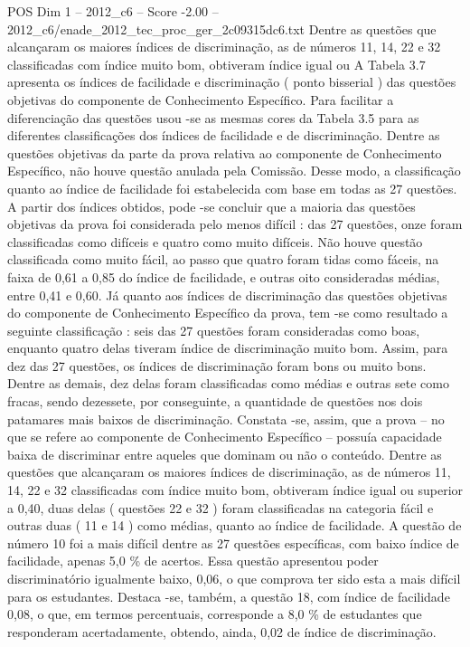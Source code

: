 \begin{textsample}{POS Dim 1 – 2012\_c6 – Score -2.00 – 2012\_c6/enade\_2012\_tec\_proc\_ger\_2c09315dc6.txt}
Dentre as questões que alcançaram os maiores índices de discriminação, as de números 11, 14, 22 e 32 classificadas com índice muito bom, obtiveram índice igual ou A Tabela 3.7 apresenta os índices de facilidade e discriminação ( ponto bisserial ) das questões objetivas do componente de Conhecimento Específico.
Para facilitar a diferenciação das questões usou -se as mesmas cores da Tabela 3.5 para as diferentes classificações dos índices de facilidade e de discriminação.
Dentre as questões objetivas da parte da prova relativa ao componente de Conhecimento Específico, não houve questão anulada pela Comissão.
Desse modo, a classificação quanto ao índice de facilidade foi estabelecida com base em todas as 27 questões.
A partir dos índices obtidos, pode -se concluir que a maioria das questões objetivas da prova foi considerada pelo menos difícil : das 27 questões, onze foram classificadas como difíceis e quatro como muito difíceis.
Não houve questão classificada como muito fácil, ao passo que quatro foram tidas como fáceis, na faixa de 0,61 a 0,85 do índice de facilidade, e outras oito consideradas médias, entre 0,41 e 0,60.
Já quanto aos índices de discriminação das questões objetivas do componente de Conhecimento Específico da prova, tem -se como resultado a seguinte classificação : seis das 27 questões foram consideradas como boas, enquanto quatro delas tiveram índice de discriminação muito bom.
Assim, para dez das 27 questões, os índices de discriminação foram bons ou muito bons.
Dentre as demais, dez delas foram classificadas como médias e outras sete como fracas, sendo dezessete, por conseguinte, a quantidade de questões nos dois patamares mais baixos de discriminação.
Constata -se, assim, que a prova – no que se refere ao componente de Conhecimento Específico – possuía capacidade baixa de discriminar entre aqueles que dominam ou não o conteúdo.
Dentre as questões que alcançaram os maiores índices de discriminação, as de números 11, 14, 22 e 32 classificadas com índice muito bom, obtiveram índice igual ou superior a 0,40, duas delas ( questões 22 e 32 ) foram classificadas na categoria fácil e outras duas ( 11 e 14 ) como médias, quanto ao índice de facilidade.
A questão de número 10 foi a mais difícil dentre as 27 questões específicas, com baixo índice de facilidade, apenas 5,0 \% de acertos.
Essa questão apresentou poder discriminatório igualmente baixo, 0,06, o que comprova ter sido esta a mais difícil para os estudantes.
Destaca -se, também, a questão 18, com índice de facilidade 0,08, o que, em termos percentuais, corresponde a 8,0 \% de estudantes que responderam acertadamente, obtendo, ainda, 0,02 de índice de discriminação.

\end{textsample}
